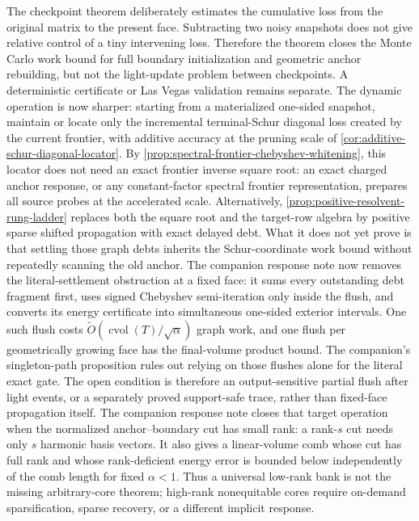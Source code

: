 The checkpoint theorem deliberately estimates the cumulative loss from the
original matrix to the present face.  Subtracting two noisy snapshots does
not give relative control of a tiny intervening loss.  Therefore the theorem
closes the Monte Carlo work bound for full boundary initialization and
geometric anchor rebuilding, but not the light-update problem between
checkpoints.  A deterministic certificate or Las Vegas validation remains
separate.  The dynamic operation is now sharper: starting from a materialized
one-sided snapshot, maintain or locate only the incremental terminal-Schur
diagonal loss created by the current frontier, with additive accuracy at the
pruning scale of \cref{cor:additive-schur-diagonal-locator}.
By \cref{prop:spectral-frontier-chebyshev-whitening}, this locator does not
need an exact frontier inverse square root: an exact charged anchor response,
or any constant-factor spectral frontier representation, prepares all source
probes at the accelerated scale.  Alternatively,
\cref{prop:positive-resolvent-rung-ladder} replaces both the square root and
the target-row algebra by positive sparse shifted propagation with exact
delayed debt.  What it does not yet prove is that settling those graph debts
inherits the Schur-coordinate work bound without repeatedly scanning the old
anchor.  The companion response note now removes the literal-settlement
obstruction at a fixed face: it sums every outstanding debt fragment first,
uses signed Chebyshev semi-iteration only inside the flush, and converts its
energy certificate into simultaneous one-sided exterior intervals.  One such
flush costs
$\widetilde O(\operatorname{cvol}(T)/\sqrt\alpha)$ graph work, and one flush
per geometrically growing face has the final-volume product bound.  The
companion's singleton-path proposition rules out relying on those flushes
alone for the literal exact gate.  The open condition is therefore an
output-sensitive partial flush after light events, or a separately proved
support-safe trace, rather than fixed-face propagation itself.
The companion response note closes that target operation when the normalized
anchor--boundary cut has small rank: a rank-$s$ cut needs only $s$ harmonic
basis vectors.  It also gives a linear-volume comb whose cut has full rank and
whose rank-deficient energy error is bounded below independently of the comb
length for fixed $\alpha<1$.  Thus a universal low-rank bank is not
the missing arbitrary-core theorem; high-rank nonequitable cores require
on-demand sparsification, sparse recovery, or a different implicit response.

